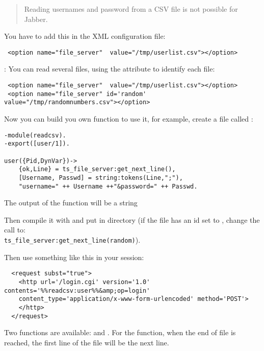 \documentclass{TSUNG-en}
\begin{document}
\begin{quote}
  Reading usernames and password from a CSV file is not possible for Jabber.
\end{quote}

You have to add this in the XML configuration file:
\begin{Verbatim}
 <option name="file_server"  value="/tmp/userlist.csv"></option>
\end{Verbatim}

: You can read several files, using the 
attribute to identify each file:
\begin{Verbatim}
 <option name="file_server"  value="/tmp/userlist.csv"></option>
 <option name="file_server" id='random' value="/tmp/randomnumbers.csv"></option>
\end{Verbatim}

Now you can build you own function to use it, for example, create a
file called :

\begin{Verbatim}
-module(readcsv).
-export([user/1]).

user({Pid,DynVar})->
    {ok,Line} = ts_file_server:get_next_line(),
    [Username, Passwd] = string:tokens(Line,";"),
    "username=" ++ Username ++"&password=" ++ Passwd.
\end{Verbatim}

The output of the function will be a string 

Then compile it with  and put
 in
 directory  (if the
file has an id set to , change the call to: \\
\texttt{ts\_file\_server:get\_next\_line(random)}).

Then use something like this in your session:

\begin{Verbatim}
  <request subst="true">
    <http url='/login.cgi' version='1.0' contents='%%readcsv:user%%&amp;op=login'
    content_type='application/x-www-form-urlencoded' method='POST'>
    </http>
  </request>
\end{Verbatim}

Two functions are available: 
and . For the
 function, when the end of file is reached, the
first line of the file will be the next line.
\end{document}
